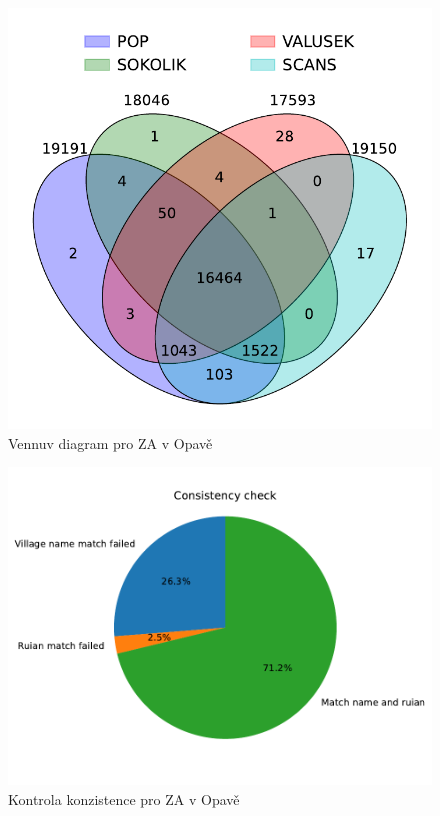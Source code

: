 \begin{figure}[htbp]
\centering
    \includegraphics[scale=.5]{obrazky-figures/dataAnalysis/zaOpava/Venn_4.pdf}
    \caption{Vennuv diagram pro ZA v Opavě}
\end{figure}

\begin{figure}[htbp]
\centering
    \includegraphics[scale=.5]{obrazky-figures/dataAnalysis/zaOpava/consistencyCheck2.pdf}
    \caption{Kontrola konzistence pro ZA v Opavě}
\end{figure}

